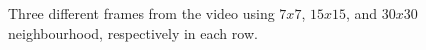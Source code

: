 \documentclass[12pt,a4paper]{article}
\begin{document}
\begin{figure}[!h]
	{
		{
			\setlength{\fboxsep}{1pt}
			\setlength{\fboxrule}{1pt}
		}
	}
	\enskip
	{
		{
			\setlength{\fboxsep}{1pt}
			\setlength{\fboxrule}{1pt}
		}	
	}
	\enskip
	{
		{
			\setlength{\fboxsep}{1pt}
			\setlength{\fboxrule}{1pt}
		}	
	}
	
	\caption{Three different frames from the video using $7x7$, $15x15$, and $30x30$ neighbourhood, respectively in each row.}
	\label{fig:keypointSelection}
\end{figure}
\end{document}
